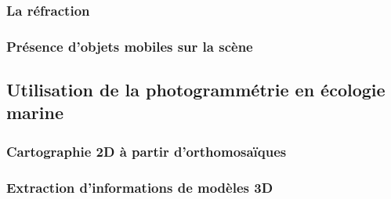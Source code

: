 \subsubsection{La réfraction}
\subsubsection{Présence d'objets mobiles sur la scène}

\newpage

\subsection[Photogrammétrie et écologie marine]{Utilisation de la photogrammétrie en écologie marine}
\subsubsection{Cartographie 2D à partir d'orthomosaïques}
\subsubsection{Extraction d'informations de modèles 3D}

\newpage

